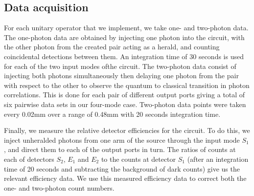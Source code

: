 \subsection{Data acquisition}
For each unitary operator that we implement, we take one- and two-photon data.
The one-photon data are obtained by injecting one photon into the circuit, with
the other photon from the created pair acting as a herald, and counting
coincidental detections between them. An integration time of 30 seconds is used
for each of the two input modes ofthe circuit.
The two-photon data consist of injecting both photons simultaneously then
delaying one photon from the pair with respect to the other to observe the
quantum to classical transition in photon correlations. This is done for each
pair of different output ports giving a total of six pairwise data sets in our
four-mode case. Two-photon data points were taken every 0.02mm over a range of
0.48mm with 20 seconds integration time.

Finally, we measure the relative detector efficiencies for the circuit. To do
this, we inject unheralded photons from one arm of the source through the input
mode \(S_1\), and direct them to each of the output ports in turn. The ratios of
counts at each of detectors \(S_2\), \(E_1\) and \(E_2\) to the counts at
detector \(S_1\) (after an integration time of 20 seconds and subtracting the
background of dark counts) give us the relevant efficiency data. We use this
measured efficiency data to correct both the one- and two-photon count numbers.

